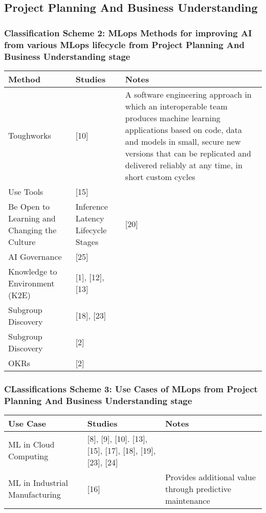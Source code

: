 \subsection{Project Planning And Business Understanding}

\subsubsection{Classification Scheme 2: MLops Methods  for improving AI from various MLops lifecycle  from Project Planning And Business Understanding stage}

\begin{tabular}{|p{6cm}|p{6cm}|p{3cm}|}
  Method & Studies & Notes \\
  \hline
  Toughworks & [10] & A software engineering approach in which an interoperable team produces machine learning applications based on code, data and models in small, secure new versions that can be replicated and delivered reliably at any time, in short custom cycles\\
  \hline
  Use Tools  & [15] & \\
  \hline
  Be Open to Learning and Changing the Culture & Inference Latency Lifecycle Stages & [20] & \\
  \hline
  AI Governance & [25] & \\
  \hline
  Knowledge to Environment (K2E) & [1], [12], [13] & \\
  \hline
  Subgroup Discovery & [18], [23] & \\
  \hline
  Subgroup Discovery & [2] & \\
  \hline
  OKRs & [2] & \\
  \hline
\end{tabular}

\subsubsection{CLassifications Scheme 3: Use Cases of MLops from Project Planning And Business Understanding stage}

\begin{tabular}{|p{6cm}|p{6cm}|p{3cm}|}
  Use Case & Studies & Notes \\
  \hline
  ML in Cloud Computing & [8], [9], [10]. [13], [15], [17], [18], [19], [23], [24] & \\
  \hline
  ML in Industrial Manufacturing & [16] & Provides additional value through predictive maintenance \\
  \hline
\end{tabular}

